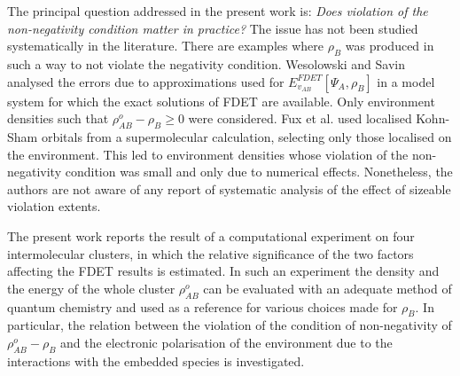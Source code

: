 \documentclass[amsmath,amssymb,preprint,aip,jcp]{revtex4-1}
\newcommand{\nr}[1]{\color{red}#1\color{black}}
\begin{document}
The principal question addressed in the present work is:  {\it Does violation of the non-negativity condition matter in practice?}  
The issue has not been studied systematically in the literature.
\nr{ There are examples where $\rho_B$ was produced in such a way to not violate the negativity condition. }
Wesolowski and Savin analysed the errors due to approximations used for ${E}_{v_{AB}}^{FDET}[\Psi_{A},\rho_B]$ in a model system for which the exact solutions of FDET are available. \nr{Only environment densities such that $\rho_{AB}^o-\rho_B \geq 0$ were considered. \cite{Wesolowski2013}}
\nr{Fux et al. \cite{Fux2010} used localised Kohn-Sham orbitals from a supermolecular calculation, selecting only those localised on the environment. This led to environment densities whose violation of the non-negativity condition was small and only due to numerical effects. Nonetheless, the authors are not aware of any report of systematic analysis of the effect of sizeable violation extents.}

The present work reports the result of a computational experiment on four intermolecular clusters, in which the relative significance 
of the two factors affecting the FDET results is \nr{estimated}. In such an experiment the density and the energy of the whole cluster \nr{$\rho_{AB}^o$ } can be evaluated with an adequate method of quantum chemistry and used as a reference for various choices made for $\rho_B$.
In particular, the relation between the violation of the condition of non-negativity of  \nr{$\rho_{AB}^o-\rho_B$ } and the electronic polarisation of the environment due to the interactions with the embedded species is investigated.
\end{document}
